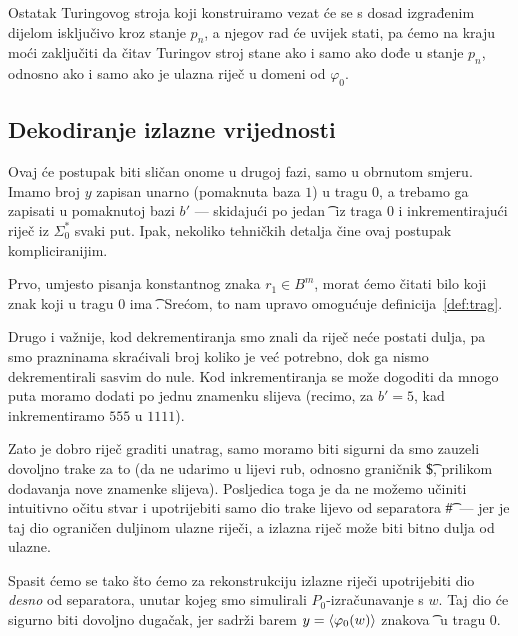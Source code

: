 \begin{napomena}[{name=[zaustavljanje transpiliranog stroja ovisi samo o trećoj fazi]}]\label{nap:snstane}
Ostatak Turingovog stroja koji konstruiramo vezat će se s dosad izgrađenim dijelom isključivo kroz stanje $p_n$, a njegov rad će uvijek stati, pa ćemo na kraju moći zaključiti da čitav Turingov stroj stane ako i samo ako dođe u stanje $p_n$, odnosno ako i samo ako je ulazna riječ u domeni od $\varphi_0$.
\end{napomena}


\subsection{Dekodiranje izlazne vrijednosti}

Ovaj će postupak biti sličan onome u drugoj fazi, samo u obrnutom smjeru. Imamo broj $y$ zapisan unarno (pomaknuta baza $1$) u tragu $0$, a trebamo ga zapisati u pomaknutoj bazi $b'$ --- skidajući po jedan \t\textbullet\ iz traga $0$ i inkrementirajući riječ iz $\Sigma_0^*$ svaki put. Ipak, nekoliko tehničkih detalja čine ovaj postupak kompliciranijim.

Prvo, umjesto pisanja konstantnog znaka $r_1\in B^m$, morat ćemo čitati bilo koji znak koji u tragu $0$ ima \t\textbullet. Srećom, to nam upravo omogućuje definicija~\ref{def:trag}.

Drugo i važnije, kod dekrementiranja smo znali da riječ neće postati dulja, pa smo prazninama skraćivali broj koliko je već potrebno, dok ga nismo dekrementirali sasvim do nule. Kod inkrementiranja se može dogoditi da mnogo puta moramo dodati po jednu znamenku slijeva (recimo, za $b'=5$, kad inkrementiramo $555$ u $1111$).

Zato je dobro riječ graditi unatrag, samo moramo biti sigurni da smo zauzeli dovoljno trake za to (da ne udarimo u lijevi rub, odnosno graničnik \t\$, prilikom dodavanja nove znamenke slijeva). Posljedica toga je da ne možemo učiniti intuitivno očitu stvar i upotrijebiti samo dio trake lijevo od separatora \t\#\ ---  jer je taj dio ograničen duljinom ulazne riječi, a izlazna riječ može biti bitno dulja od ulazne.

Spasit ćemo se tako što ćemo za rekonstrukciju izlazne riječi upotrijebiti dio \emph{desno} od separatora, unutar kojeg smo simulirali $P_0$-izračunavanje s $w$. Taj dio će sigurno biti dovoljno dugačak, jer sadrži barem $y=\langle\varphi_0(w)\rangle$ znakova \t\textbullet\ u tragu $0$.

